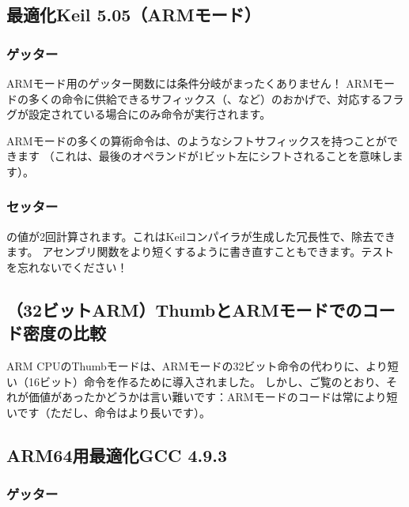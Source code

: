 

\subsection{最適化Keil 5.05（ARMモード）}

\subsubsection{ゲッター}

ARMモード用のゲッター関数には条件分岐がまったくありません！
ARMモードの多くの命令に供給できるサフィックス（、など）のおかげで、対応するフラグが設定されている場合にのみ命令が実行されます。

ARMモードの多くの算術命令は、のようなシフトサフィックスを持つことができます
（これは、最後のオペランドが1ビット左にシフトされることを意味します）。



\subsubsection{セッター}



の値が2回計算されます。これはKeilコンパイラが生成した冗長性で、除去できます。
アセンブリ関数をより短くするように書き直すこともできます。テストを忘れないでください！

\subsection{（32ビットARM）ThumbとARMモードでのコード密度の比較}

ARM CPUのThumbモードは、ARMモードの32ビット命令の代わりに、より短い（16ビット）命令を作るために導入されました。
しかし、ご覧のとおり、それが価値があったかどうかは言い難いです：ARMモードのコードは常により短いです（ただし、命令はより長いです）。

\subsection{ARM64用最適化GCC 4.9.3}

\subsubsection{ゲッター}

